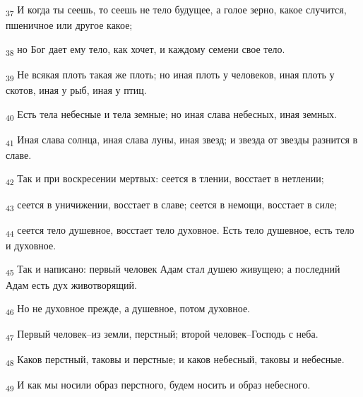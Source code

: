 \begin{tcolorbox}
\textsubscript{37} И когда ты сеешь, то сеешь не тело будущее, а голое зерно, какое случится, пшеничное или другое какое;
\end{tcolorbox}
\begin{tcolorbox}
\textsubscript{38} но Бог дает ему тело, как хочет, и каждому семени свое тело.
\end{tcolorbox}
\begin{tcolorbox}
\textsubscript{39} Не всякая плоть такая же плоть; но иная плоть у человеков, иная плоть у скотов, иная у рыб, иная у птиц.
\end{tcolorbox}
\begin{tcolorbox}
\textsubscript{40} Есть тела небесные и тела земные; но иная слава небесных, иная земных.
\end{tcolorbox}
\begin{tcolorbox}
\textsubscript{41} Иная слава солнца, иная слава луны, иная звезд; и звезда от звезды разнится в славе.
\end{tcolorbox}
\begin{tcolorbox}
\textsubscript{42} Так и при воскресении мертвых: сеется в тлении, восстает в нетлении;
\end{tcolorbox}
\begin{tcolorbox}
\textsubscript{43} сеется в уничижении, восстает в славе; сеется в немощи, восстает в силе;
\end{tcolorbox}
\begin{tcolorbox}
\textsubscript{44} сеется тело душевное, восстает тело духовное. Есть тело душевное, есть тело и духовное.
\end{tcolorbox}
\begin{tcolorbox}
\textsubscript{45} Так и написано: первый человек Адам стал душею живущею; а последний Адам есть дух животворящий.
\end{tcolorbox}
\begin{tcolorbox}
\textsubscript{46} Но не духовное прежде, а душевное, потом духовное.
\end{tcolorbox}
\begin{tcolorbox}
\textsubscript{47} Первый человек--из земли, перстный; второй человек--Господь с неба.
\end{tcolorbox}
\begin{tcolorbox}
\textsubscript{48} Каков перстный, таковы и перстные; и каков небесный, таковы и небесные.
\end{tcolorbox}
\begin{tcolorbox}
\textsubscript{49} И как мы носили образ перстного, будем носить и образ небесного.
\end{tcolorbox}
